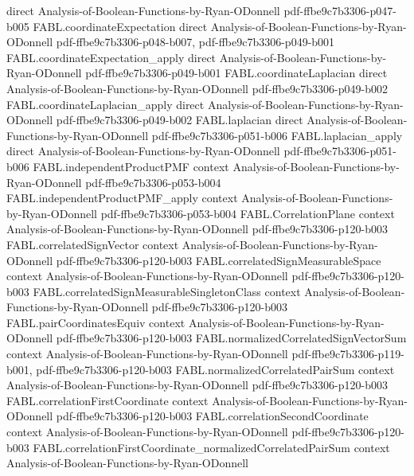 \begin{theorem}
  {direct}
  {Analysis-of-Boolean-Functions-by-Ryan-ODonnell}
  {pdf-ffbe9c7b3306-p047-b005}
\proofstep
  {FABL.coordinateExpectation}
  {direct}
  {Analysis-of-Boolean-Functions-by-Ryan-ODonnell}
  {pdf-ffbe9c7b3306-p048-b007,
    pdf-ffbe9c7b3306-p049-b001}
\proofstep
  {FABL.coordinateExpectation_apply}
  {direct}
  {Analysis-of-Boolean-Functions-by-Ryan-ODonnell}
  {pdf-ffbe9c7b3306-p049-b001}
\proofstep
  {FABL.coordinateLaplacian}
  {direct}
  {Analysis-of-Boolean-Functions-by-Ryan-ODonnell}
  {pdf-ffbe9c7b3306-p049-b002}
\proofstep
  {FABL.coordinateLaplacian_apply}
  {direct}
  {Analysis-of-Boolean-Functions-by-Ryan-ODonnell}
  {pdf-ffbe9c7b3306-p049-b002}
\proofstep
  {FABL.laplacian}
  {direct}
  {Analysis-of-Boolean-Functions-by-Ryan-ODonnell}
  {pdf-ffbe9c7b3306-p051-b006}
\proofstep
  {FABL.laplacian_apply}
  {direct}
  {Analysis-of-Boolean-Functions-by-Ryan-ODonnell}
  {pdf-ffbe9c7b3306-p051-b006}
\proofstep
  {FABL.independentProductPMF}
  {context}
  {Analysis-of-Boolean-Functions-by-Ryan-ODonnell}
  {pdf-ffbe9c7b3306-p053-b004}
\proofstep
  {FABL.independentProductPMF_apply}
  {context}
  {Analysis-of-Boolean-Functions-by-Ryan-ODonnell}
  {pdf-ffbe9c7b3306-p053-b004}
\proofstep
  {FABL.CorrelationPlane}
  {context}
  {Analysis-of-Boolean-Functions-by-Ryan-ODonnell}
  {pdf-ffbe9c7b3306-p120-b003}
\proofstep
  {FABL.correlatedSignVector}
  {context}
  {Analysis-of-Boolean-Functions-by-Ryan-ODonnell}
  {pdf-ffbe9c7b3306-p120-b003}
\proofstep
  {FABL.correlatedSignMeasurableSpace}
  {context}
  {Analysis-of-Boolean-Functions-by-Ryan-ODonnell}
  {pdf-ffbe9c7b3306-p120-b003}
\proofstep
  {FABL.correlatedSignMeasurableSingletonClass}
  {context}
  {Analysis-of-Boolean-Functions-by-Ryan-ODonnell}
  {pdf-ffbe9c7b3306-p120-b003}
\proofstep
  {FABL.pairCoordinatesEquiv}
  {context}
  {Analysis-of-Boolean-Functions-by-Ryan-ODonnell}
  {pdf-ffbe9c7b3306-p120-b003}
\proofstep
  {FABL.normalizedCorrelatedSignVectorSum}
  {context}
  {Analysis-of-Boolean-Functions-by-Ryan-ODonnell}
  {pdf-ffbe9c7b3306-p119-b001,
    pdf-ffbe9c7b3306-p120-b003}
\proofstep
  {FABL.normalizedCorrelatedPairSum}
  {context}
  {Analysis-of-Boolean-Functions-by-Ryan-ODonnell}
  {pdf-ffbe9c7b3306-p120-b003}
\proofstep
  {FABL.correlationFirstCoordinate}
  {context}
  {Analysis-of-Boolean-Functions-by-Ryan-ODonnell}
  {pdf-ffbe9c7b3306-p120-b003}
\proofstep
  {FABL.correlationSecondCoordinate}
  {context}
  {Analysis-of-Boolean-Functions-by-Ryan-ODonnell}
  {pdf-ffbe9c7b3306-p120-b003}
\proofstep
  {FABL.correlationFirstCoordinate_normalizedCorrelatedPairSum}
  {context}
  {Analysis-of-Boolean-Functions-by-Ryan-ODonnell}

\end{theorem}
